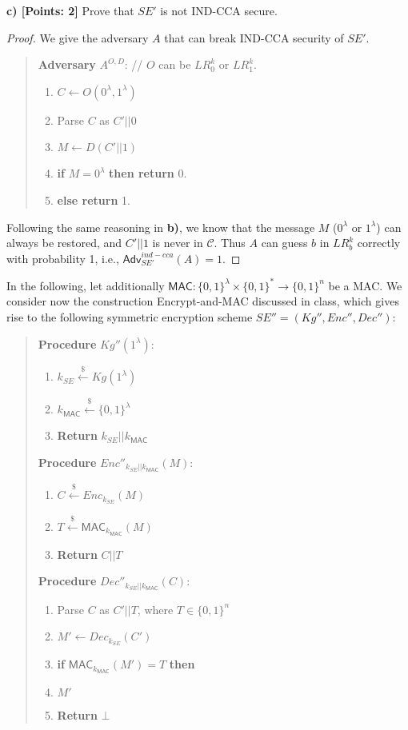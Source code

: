 \documentclass[12pt]{article}
\newcommand{\bits}{\{0,1\}}
\newcommand{\getsr}{\stackrel{\$}{\gets}}
\newcommand{\Adv}{\textsf{Adv}}
\newcommand{\tab}{\hspace{0.3in}}
\newcommand{\MAC}{\textsf{MAC}}
\newcommand{\C}{\mathcal{C}}
\theoremstyle{definition}
\begin{document}
{\bf c) [Points: 2]} Prove that $SE'$ is not IND-CCA secure.
\begin{proof}
We give the adversary $A$ that can break IND-CCA security of $SE'$.
\begin{quote}
{\bf Adversary} $A^{O, D}$: // $O$ can be $LR_0^k$ or $LR_1^k$.
\begin{enumerate}
\item $C \gets O(0^\lambda, 1^\lambda)$
\item Parse $C$ as $C'||0$
\item $M \gets D(C'||1)$
\item {\bf if} $M=0^\lambda$ {\bf then return} 0.
\item {\bf else return} 1.
\end{enumerate}
\end{quote}
Following the same reasoning in {\bf b)}, we know that the message $M$ ($0^\lambda$ or $1^\lambda$) can always be restored, and $C'||1$ is never in $\C$. Thus $A$ can guess $b$ in $LR_b^k$ correctly with probability 1, i.e., $\Adv_{SE'}^{ind-cca}(A) = 1$.
\end{proof}

In the following, let additionally $\MAC : \bits^\lambda \times \bits^* \to \bits^n$ be a MAC. We consider now the construction Encrypt-and-MAC discussed in class, which gives rise to the following symmetric encryption scheme $SE'' = (Kg'', Enc'', Dec'')$:
\begin{quote}
\begin{minipage}[t]{.3\textwidth}
{\bf Procedure} $Kg''(1^\lambda)$:
\begin{enumerate}
\item $k_{SE} \getsr Kg(1^\lambda)$
\item $k_{\MAC} \getsr \bits^\lambda$
\item {\bf Return} $k_{SE}||k_{\MAC}$
\end{enumerate}
\end{minipage}
\begin{minipage}[t]{.5\textwidth}
{\bf Procedure} $Enc''_{k_{SE}||k_{\MAC}}(M)$:
\begin{enumerate}
\item $C \getsr Enc_{k_{SE}} (M)$
\item $T \getsr \MAC_{k_{\MAC}}(M)$
\item {\bf Return} $C||T$
\end{enumerate}
\end{minipage}

\begin{minipage}[t]{.5\textwidth}
{\bf Procedure} $Dec''_{k_{SE}||k_{\MAC}}(C)$:
\begin{enumerate}
\item Parse $C$ as $C'||T$, where $T \in \bits^n$
\item $M' \gets Dec_{k_{SE}} (C')$
\item {\bf if} $\MAC_{k_{\MAC}}(M') = T$ {\bf then}
\item \tab {\bf Return} $M'$
\item {\bf Return} $\bot$
\end{enumerate}
\end{minipage}
\end{quote}
\end{document}
